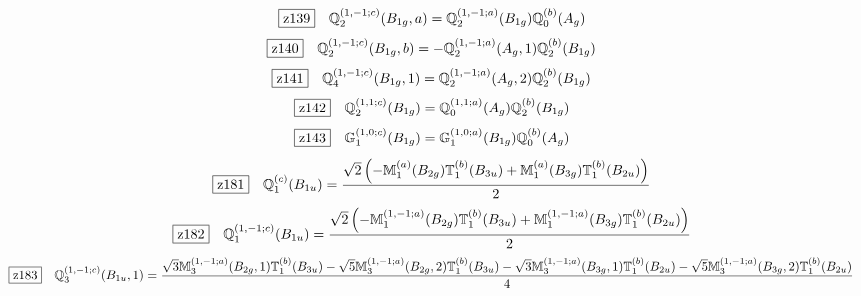 \documentclass[fleqn,10pt,landscape]{jsarticle}
\begin{document}
\begin{dmath*}
\hspace*{3mm}\fbox{z139}\quad \mathbb{Q}_{2}^{(1,-1;c)}(B_{1g},a)=\mathbb{Q}_{2}^{(1,-1;a)}(B_{1g}) \mathbb{Q}_{0}^{(b)}(A_{g})
\end{dmath*}
\begin{dmath*}
\hspace*{3mm}\fbox{z140}\quad \mathbb{Q}_{2}^{(1,-1;c)}(B_{1g},b)=- \mathbb{Q}_{2}^{(1,-1;a)}(A_{g},1) \mathbb{Q}_{2}^{(b)}(B_{1g})
\end{dmath*}
\begin{dmath*}
\hspace*{3mm}\fbox{z141}\quad \mathbb{Q}_{4}^{(1,-1;c)}(B_{1g},1)=\mathbb{Q}_{2}^{(1,-1;a)}(A_{g},2) \mathbb{Q}_{2}^{(b)}(B_{1g})
\end{dmath*}
\begin{dmath*}
\hspace*{3mm}\fbox{z142}\quad \mathbb{Q}_{2}^{(1,1;c)}(B_{1g})=\mathbb{Q}_{0}^{(1,1;a)}(A_{g}) \mathbb{Q}_{2}^{(b)}(B_{1g})
\end{dmath*}
\begin{dmath*}
\hspace*{3mm}\fbox{z143}\quad \mathbb{G}_{1}^{(1,0;c)}(B_{1g})=\mathbb{G}_{1}^{(1,0;a)}(B_{1g}) \mathbb{Q}_{0}^{(b)}(A_{g})
\end{dmath*}
\begin{dmath*}
\hspace*{3mm}\fbox{z181}\quad \mathbb{Q}_{1}^{(c)}(B_{1u})=\frac{\sqrt{2} \left(- \mathbb{M}_{1}^{(a)}(B_{2g}) \mathbb{T}_{1}^{(b)}(B_{3u}) + \mathbb{M}_{1}^{(a)}(B_{3g}) \mathbb{T}_{1}^{(b)}(B_{2u})\right)}{2}
\end{dmath*}
\begin{dmath*}
\hspace*{3mm}\fbox{z182}\quad \mathbb{Q}_{1}^{(1,-1;c)}(B_{1u})=\frac{\sqrt{2} \left(- \mathbb{M}_{1}^{(1,-1;a)}(B_{2g}) \mathbb{T}_{1}^{(b)}(B_{3u}) + \mathbb{M}_{1}^{(1,-1;a)}(B_{3g}) \mathbb{T}_{1}^{(b)}(B_{2u})\right)}{2}
\end{dmath*}
\begin{dmath*}
\hspace*{3mm}\fbox{z183}\quad \mathbb{Q}_{3}^{(1,-1;c)}(B_{1u},1)=\frac{\sqrt{3} \mathbb{M}_{3}^{(1,-1;a)}(B_{2g},1) \mathbb{T}_{1}^{(b)}(B_{3u}) - \sqrt{5} \mathbb{M}_{3}^{(1,-1;a)}(B_{2g},2) \mathbb{T}_{1}^{(b)}(B_{3u}) - \sqrt{3} \mathbb{M}_{3}^{(1,-1;a)}(B_{3g},1) \mathbb{T}_{1}^{(b)}(B_{2u}) - \sqrt{5} \mathbb{M}_{3}^{(1,-1;a)}(B_{3g},2) \mathbb{T}_{1}^{(b)}(B_{2u})}{4}
\end{dmath*}
\end{document}
